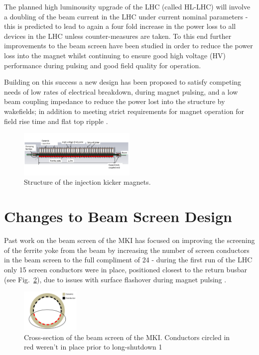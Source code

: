 \documentclass[a4paper,
              ]{jacow}
\begin{document}
The planned high luminousity upgrade of the LHC (called HL-LHC) will involve a doubling of the beam current in the LHC under current nominal parameters \cite{HLLHCPara} - this is predicted to lead to again a four fold increase in the power loss to all devices in the LHC unless counter-measures are taken. To this end further improvements to the beam screen have been studied in order to reduce the power loss into the magnet whilst continuing to ensure good high voltage (HV) performance during pulsing and good field quality for operation.

Building on this success a new design has been proposed to satisfy competing needs of low rates of electrical breakdown, during magnet pulsing, and a low beam coupling impedance to reduce the power lost into the structure by wakefields; in addition to meeting strict requirements for magnet operation for field rise time and flat top ripple \cite{mkiUpgrade}. 

\begin{figure}
\includegraphics[width=0.5\textwidth]{MKICrossSectionYZ.pdf}
\caption{Structure of the injection kicker magnets.}
\label{fig:mkiStruct}
\end{figure}

\section{Changes to Beam Screen Design}

Past work on the beam screen of the MKI has focused on improving the screening of the ferrite yoke from the beam by increasing the number of screen conductors in the beam screen to the full compliment of 24 - during the first run of the LHC only 15 screen conductors were in place, positioned closest to the return busbar (see Fig.~\ref{fig:LengthWiseSlice}), due to issues with surface flashover during magnet pulsing \cite{mki-ElecBreakdown}. 

\begin{figure}
\begin{center}
\includegraphics[width=0.25\textwidth]{sliceLabelled.pdf}
\caption{Cross-section of the beam screen of the MKI. Conductors circled in red weren't in place prior to long-shutdown 1}
\label{fig:LengthWiseSlice}
\end{center}
\end{figure}
\end{document}
